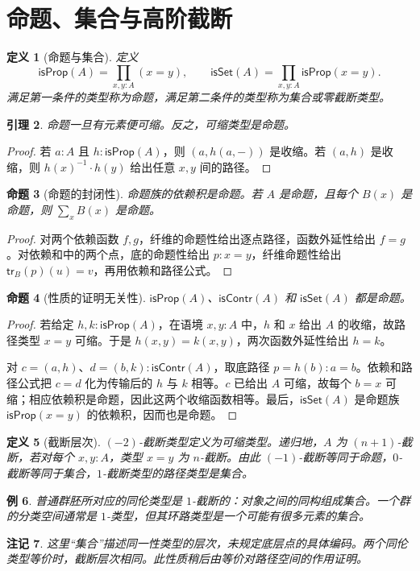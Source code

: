 \documentclass[12pt,oneside,openany,fontset=none]{ctexbook}
\theoremstyle{cn}
\newtheorem{definition}{定义}[chapter]
\newtheorem{example}[definition]{例}
\newtheorem{lemma}[definition]{引理}
\newtheorem{proposition}[definition]{命题}
\newtheorem{remark}[definition]{注记}
\numberwithin{equation}{chapter}
\newcommand{\tr}{\mathsf{tr}}
\newcommand{\isContr}{\mathsf{isContr}}
\newcommand{\isProp}{\mathsf{isProp}}
\newcommand{\isSet}{\mathsf{isSet}}
\begin{document}
\section{命题、集合与高阶截断}
\begin{definition}[命题与集合]
定义
\[
\isProp(A)=\prod_{x,y:A}(x=y),
\qquad
\isSet(A)=\prod_{x,y:A}\isProp(x=y).
\]
满足第一条件的类型称为命题，满足第二条件的类型称为集合或零截断类型。
\end{definition}
\begin{lemma}
命题一旦有元素便可缩。反之，可缩类型是命题。
\end{lemma}
\begin{proof}
若 $a:A$ 且 $h:\isProp(A)$，则 $(a,h(a,-))$ 是收缩。若 $(a,h)$ 是收缩，则 $h(x)^{-1}\cdot h(y)$ 给出任意 $x,y$ 间的路径。
\end{proof}
\begin{proposition}[命题的封闭性]
命题族的依赖积是命题。若 $A$ 是命题，且每个 $B(x)$ 是命题，则 $\sum_xB(x)$ 是命题。
\end{proposition}
\begin{proof}
对两个依赖函数 $f,g$，纤维的命题性给出逐点路径，函数外延性给出 $f=g$。对依赖和中的两个点，底的命题性给出 $p:x=y$，纤维命题性给出 $\tr_B(p)(u)=v$，再用依赖和路径公式。
\end{proof}
\begin{proposition}[性质的证明无关性]
$\isProp(A)$、$\isContr(A)$ 和 $\isSet(A)$ 都是命题。
\end{proposition}
\begin{proof}
若给定 $h,k:\isProp(A)$，在语境 $x,y:A$ 中，$h$ 和 $x$ 给出 $A$ 的收缩，故路径类型 $x=y$ 可缩。于是 $h(x,y)=k(x,y)$，两次函数外延性给出 $h=k$。

对 $c=(a,h)$、$d=(b,k):\isContr(A)$，取底路径 $p=h(b):a=b$。依赖和路径公式把 $c=d$ 化为传输后的 $h$ 与 $k$ 相等。$c$ 已给出 $A$ 可缩，故每个 $b=x$ 可缩；相应依赖积是命题，因此这两个收缩函数相等。最后，$\isSet(A)$ 是命题族 $\isProp(x=y)$ 的依赖积，因而也是命题。
\end{proof}
\begin{definition}[截断层次]
$(-2)$-截断类型定义为可缩类型。递归地，$A$ 为 $(n+1)$-截断，若对每个 $x,y:A$，类型 $x=y$ 为 $n$-截断。由此 $(-1)$-截断等同于命题，$0$-截断等同于集合，$1$-截断类型的路径类型是集合。
\end{definition}
\begin{example}
普通群胚所对应的同伦类型是 $1$-截断的：对象之间的同构组成集合。一个群的分类空间通常是 $1$-类型，但其环路类型是一个可能有很多元素的集合。
\end{example}
\begin{remark}
这里“集合”描述同一性类型的层次，未规定底层点的具体编码。两个同伦类型等价时，截断层次相同。此性质稍后由等价对路径空间的作用证明。
\end{remark}
\end{document}
